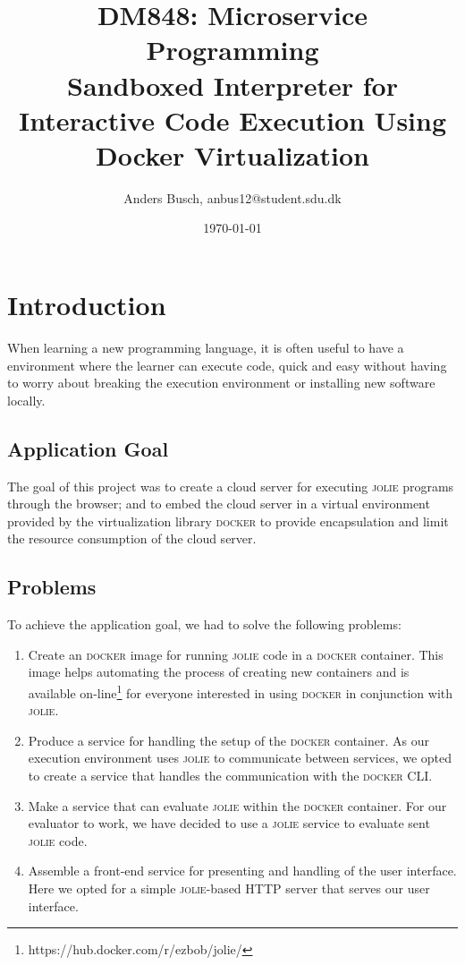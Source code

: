 \documentclass[12pt]{article}
\title{ \textbf{DM848}: Microservice Programming \\ {\Large Sandboxed Interpreter for Interactive Code Execution Using Docker Virtualization} }
\author{Anders Busch, anbus12@student.sdu.dk}
\date{\today \\ \hrulefill{}}
\newcommand{\docker}[0] {\textsc{docker}}
\newcommand{\jolie}[0] {\textsc{jolie}}
\begin{document}
\maketitle
\tableofcontents
\newpage

\section{Introduction}

When learning a new programming language, it is often useful to have a environment where the learner can execute code, quick and easy without having to worry about breaking the execution environment or installing new software locally.

\subsection{Application Goal}

The goal of this project was to create a cloud server for executing \jolie{} programs through the browser; and to embed the cloud server in a virtual environment provided by the virtualization library \docker{} to provide encapsulation and limit the resource consumption of the cloud server.

\subsection{Problems}

To achieve the application goal, we had to solve the following problems:
\begin{enumerate}
	\item Create an \docker{} image for running \jolie{} code in a \docker{} container. This image helps automating the process of creating new containers and is available on-line\footnote{https://hub.docker.com/r/ezbob/jolie/} for everyone interested in using \docker{} in conjunction with \jolie{}.
	\item Produce a service for handling the setup of the \docker{} container. As our execution environment uses \jolie{} to communicate between services, we opted to create a service that handles the communication with the \docker{} CLI.
	\item Make a service that can evaluate \jolie{} within the \docker{} container. For our evaluator to work, we have decided to use a \jolie{} service to evaluate sent \jolie{} code.
	\item Assemble a front-end service for presenting and handling of the user interface. Here we opted for a simple \jolie{}-based HTTP server that serves our user interface. 
\end{enumerate}
\end{document}
